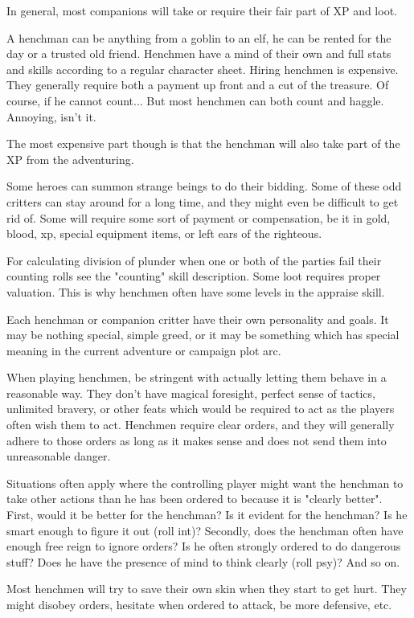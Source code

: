 In general, most companions will take or require their fair part of XP and loot.


\openitemslist

A henchman can be anything from a goblin to an elf, he can be rented for the day or a trusted old friend. Henchmen have a mind of their own and full stats and skills according to a regular character sheet.
Hiring henchmen is expensive. They generally require both a payment up front and a cut of the treasure. Of course, if he cannot count... But most henchmen can both count and haggle. Annoying, isn't it.

The most expensive part though is that the henchman will also take part of the XP from the adventuring.


Some heroes can summon strange beings to do their bidding. Some of these odd critters can stay around for a long time, and they might even be difficult to get rid of. Some will require some sort of payment or compensation, be it in gold, blood, xp, special equipment items, or left ears of the righteous.

\closeitemslist


For calculating division of plunder when one or both of the parties fail their counting rolls see the "counting" skill description. Some loot requires proper valuation. This is why henchmen often have some levels in the appraise skill.

Each henchman or companion critter have their own personality and goals. It may be nothing special, simple greed, or it may be something which has special meaning in the current adventure or campaign plot arc.

When playing henchmen, be stringent with actually letting them behave in a reasonable way. They don't have magical foresight, perfect sense of tactics, unlimited bravery, or other feats which would be required to act as the players often wish them to act. Henchmen require clear orders, and they will generally adhere to those orders as long as it makes sense and does not send them into unreasonable danger.

Situations often apply where the controlling player might want the henchman to take other actions than he has been ordered to because it is "clearly better". First, would it be better for the henchman? Is it evident for the henchman? Is he smart enough to figure it out (roll int)? Secondly, does the henchman often have enough free reign to ignore orders? Is he often strongly ordered to do dangerous stuff? Does he have the presence of mind to think clearly (roll psy)? And so on.

Most henchmen will try to save their own skin when they start to get hurt. They might disobey orders, hesitate when ordered to attack, be more defensive, etc.

